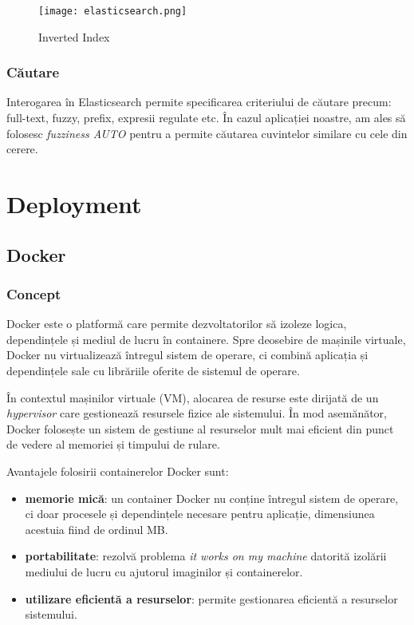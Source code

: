 \begin{figure}[h]
    \centering
    \texttt{[image: elasticsearch.png]}
    \caption{Inverted Index\protect\footnotemark[3]}
    \label{fig:elasticsearch}
\end{figure}


\subsubsection{Căutare}
Interogarea în Elasticsearch permite specificarea criteriului de căutare precum: full-text, fuzzy, prefix,
expresii regulate etc. În cazul aplicației noastre, am ales să folosesc \textit{fuzziness AUTO} pentru a 
permite căutarea cuvintelor similare cu cele din cerere.

\section{Deployment}
\subsection{Docker}

\subsubsection{Concept}
Docker este o platformă care permite dezvoltatorilor să izoleze logica, dependințele și mediul de lucru
în containere. Spre deosebire de mașinile virtuale, Docker nu virtualizează întregul sistem de operare,
ci combină aplicația și dependințele sale cu librăriile oferite de sistemul de operare.
\par
În contextul mașinilor virtuale (VM), alocarea de resurse este dirijată de un \textit{hypervisor} care
gestionează resursele fizice ale sistemului. În mod asemănător, Docker folosește un sistem de gestiune
al resurselor mult mai eficient din punct de vedere al memoriei și timpului de rulare. 
\par
Avantajele folosirii containerelor Docker sunt:
\begin{itemize}
    \item \textbf{memorie mică}: un container Docker nu conține întregul sistem de operare, ci doar
    procesele și dependințele necesare pentru aplicație, dimensiunea acestuia fiind de ordinul MB.
    \item \textbf{portabilitate}: rezolvă problema \textit{it works on my machine} datorită
    izolării mediului de lucru cu ajutorul imaginilor și containerelor.
    \item \textbf{utilizare eficientă a resurselor}: permite gestionarea eficientă a resurselor sistemului.
\end{itemize}

